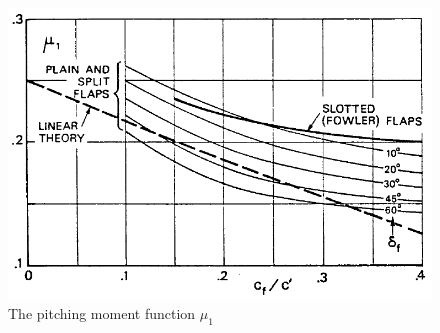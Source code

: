 \begin{figure}[H]
\centering
\includegraphics[width=0.75\linewidth]{Immagini/Mu1_Pitching_Moment}
\caption{The pitching moment function $\mu_1$}
\label{fig:Mu1}
\end{figure}
%
